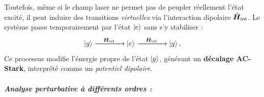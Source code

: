\noindent Toutefois, même si le champ laser ne permet pas de peupler réellement l’état excité, il peut induire des transitions \emph{virtuelles} via l’interaction dipolaire \(  \hat{\bm{H}}_{\text{int}} \). Le système passe temporairement par l’état \( \ket{e} \) sans s’y stabiliser :
\begin{equation}
\ket{g} \xrightarrow{\quad \hat{\bm{H}}_{\text{int}} \quad} \ket{e} \xrightarrow{\quad \hat{\bm{H}}_{\text{int}} \quad} \ket{g},
\end{equation}
Ce processus modifie l’énergie propre de l’état \( \ket{g} \), générant un \textbf{décalage AC-Stark}, interprété comme un \emph{potentiel dipolaire}.

\bigskip

\subparagraph{Analyse perturbative à différents ordres :}

